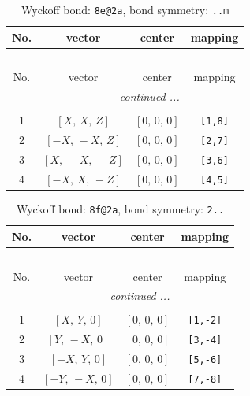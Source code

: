 \documentclass[fleqn,8pt]{jsarticle}
\begin{document}
\renewcommand{\arraystretch}{1.2}
\begin{longtable}{cccc}
\caption{Wyckoff bond: {\tt 8e@2a}, bond symmetry: {\tt ..m}}
 \\
 \hline \hline
No. & vector & center & mapping \\ \hline \endfirsthead

\multicolumn{3}{l}{\tablename\ \thetable{}} \\
 \hline \hline
No. & vector & center & mapping \\ \hline \endhead

 \hline \hline
\multicolumn{3}{r}{\footnotesize\it continued ...} \\ \endfoot

 \hline \hline
\multicolumn{3}{r}{} \\ \endlastfoot

1 & $\left[ X,\, X,\, Z \right]$ & $\left[ 0,\, 0,\, 0 \right]$ & {\tt [1,8]} \\ \hline
2 & $\left[ - X,\, - X,\, Z \right]$ & $\left[ 0,\, 0,\, 0 \right]$ & {\tt [2,7]} \\ \hline
3 & $\left[ X,\, - X,\, - Z \right]$ & $\left[ 0,\, 0,\, 0 \right]$ & {\tt [3,6]} \\ \hline
4 & $\left[ - X,\, X,\, - Z \right]$ & $\left[ 0,\, 0,\, 0 \right]$ & {\tt [4,5]} \\
\end{longtable}
\renewcommand{\arraystretch}{1.2}
\begin{longtable}{cccc}
\caption{Wyckoff bond: {\tt 8f@2a}, bond symmetry: {\tt 2..}}
 \\
 \hline \hline
No. & vector & center & mapping \\ \hline \endfirsthead

\multicolumn{3}{l}{\tablename\ \thetable{}} \\
 \hline \hline
No. & vector & center & mapping \\ \hline \endhead

 \hline \hline
\multicolumn{3}{r}{\footnotesize\it continued ...} \\ \endfoot

 \hline \hline
\multicolumn{3}{r}{} \\ \endlastfoot

1 & $\left[ X,\, Y,\, 0 \right]$ & $\left[ 0,\, 0,\, 0 \right]$ & {\tt [1,-2]} \\ \hline
2 & $\left[ Y,\, - X,\, 0 \right]$ & $\left[ 0,\, 0,\, 0 \right]$ & {\tt [3,-4]} \\ \hline
3 & $\left[ - X,\, Y,\, 0 \right]$ & $\left[ 0,\, 0,\, 0 \right]$ & {\tt [5,-6]} \\ \hline
4 & $\left[ - Y,\, - X,\, 0 \right]$ & $\left[ 0,\, 0,\, 0 \right]$ & {\tt [7,-8]} \\
\end{longtable}
\end{document}
